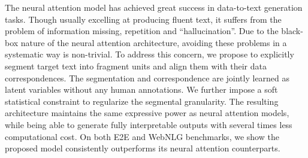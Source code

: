The neural attention model has achieved great success in data-to-text generation tasks. Though usually excelling at producing fluent text, it suffers from the problem of information missing, repetition and ``hallucination''. Due to the black-box nature of the neural attention architecture, avoiding these problems in a systematic way is non-trivial. To address this concern, we propose to explicitly segment target text into fragment units and align them with their data correspondences. The segmentation and correspondence are jointly learned as latent variables without any human annotations. We further impose a soft statistical constraint to regularize the segmental granularity. The resulting architecture maintains the same expressive power as neural attention models, while being able to generate fully interpretable outputs with several times less computational cost. On both E2E and WebNLG benchmarks, we show the proposed model consistently outperforms its neural attention counterparts.
